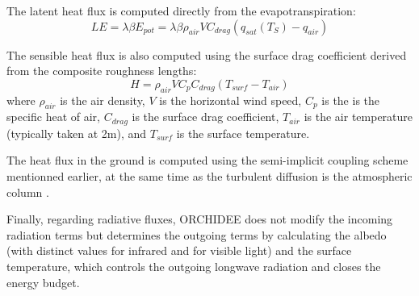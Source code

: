 

The latent heat flux is computed directly from the evapotranspiration:
\begin{equation}
    LE = \lambda \beta E_{pot} = \lambda \beta \rho_{air} V C_{drag} (q_{sat}(T_S) - q_{air})
\end{equation}

The sensible heat flux is also computed using the surface drag coefficient derived from the composite roughness lengths:
\begin{equation}
    H = \rho_{air}  V C_p C_{drag} (T_{surf} - T_{air})
\end{equation}
where $\rho_{air}$ is the air density, $V$ is the horizontal wind speed, $C_p$ is the is the specific heat of air, $C_{drag}$ is the surface drag coefficient, $T_{air}$ is the air temperature (typically taken at 2m), and $T_{surf}$ is the surface temperature.

The heat flux in the ground is computed using the semi-implicit coupling scheme mentionned earlier, at the same time as the turbulent diffusion is the atmospheric column \citep{polcher_proposal_1998}. 

Finally, regarding radiative fluxes, ORCHIDEE does not modify the incoming radiation terms but determines the outgoing terms by calculating the albedo (with distinct values for infrared and for visible light) and the surface temperature, which controls the outgoing longwave radiation and closes the energy budget. %


